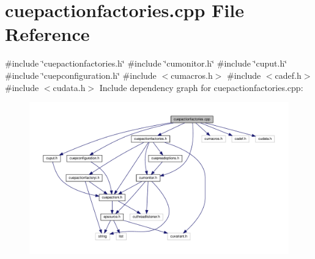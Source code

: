 \section{cuepactionfactories.\+cpp File Reference}
\label{cuepactionfactories_8cpp}
{\ttfamily \#include \char`\"{}cuepactionfactories.\+h\char`\"{}}\newline
{\ttfamily \#include \char`\"{}cumonitor.\+h\char`\"{}}\newline
{\ttfamily \#include \char`\"{}cuput.\+h\char`\"{}}\newline
{\ttfamily \#include \char`\"{}cuepconfiguration.\+h\char`\"{}}\newline
{\ttfamily \#include $<$cumacros.\+h$>$}\newline
{\ttfamily \#include $<$cadef.\+h$>$}\newline
{\ttfamily \#include $<$cudata.\+h$>$}\newline
Include dependency graph for cuepactionfactories.\+cpp\+:\nopagebreak
\begin{figure}[H]
\begin{center}
\leavevmode
\includegraphics[width=350pt]{cuepactionfactories_8cpp__incl}
\end{center}
\end{figure}
